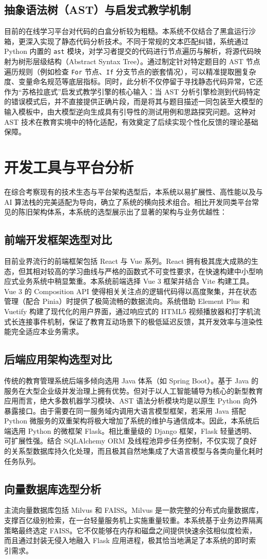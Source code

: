 \subsection{抽象语法树（AST）与启发式教学机制}
目前的在线学习平台对代码的白盒分析较为粗糙。本系统不仅结合了黑盒运行沙箱，更深入实现了静态代码分析技术。不同于常规的文本匹配纠错，系统通过 Python 内置的 \texttt{ast} 模块，对学习者提交的代码进行节点遍历与解析，将源代码映射为树形层级结构（Abstract Syntax Tree）。通过制定针对特定题目的 AST 节点遍历规则（例如检查 \texttt{For} 节点、\texttt{If} 分支节点的嵌套情况），可以精准提取圈复杂度、变量命名规范等底层指标。同时，此分析不仅停留于寻找静态代码异常，它还作为“苏格拉底式”启发式教学引擎的核心输入：当 AST 分析引擎检测到代码特定的错误模式后，并不直接提供正确片段，而是将其与题目描述一同包装至大模型的输入模板中，由大模型逆向生成具有引导性的测试用例和思路探究问题。这种对 AST 技术在教育实境中的特化适配，有效奠定了后续实现个性化反馈的理论基础保障。

\section{开发工具与平台分析}

在综合考察现有的技术生态与平台架构选型后，本系统以易扩展性、高性能以及与 AI 算法栈的完美适配为导向，确立了系统的横向技术组合。相比开发同类平台常见的陈旧架构体系，本系统的选型展示出了显著的架构与业务优越性：

\subsection{前端开发框架选型对比}
目前业界流行的前端框架包括 React 与 Vue 系列。React 拥有极其庞大成熟的生态，但其相对较高的学习曲线与严格的函数式不可变性要求，在快速构建中小型响应式业务系统中稍显繁重。本系统前端选择 Vue 3 框架并结合 Vite 构建工具。Vue 3 的 Composition API 使得相关关注点的逻辑代码得以高度聚集，并在状态管理（配合 Pinia）时提供了极简流畅的数据流向。系统借助 Element Plus 和 Vuetify 构建了现代化的用户界面，通过响应式的 HTML5 视频播放器和打字机流式长连接事件机制，保证了教育互动场景下的极低延迟反馈，其开发效率与渲染性能完全适应本业务需求。

\subsection{后端应用架构选型对比}
传统的教育管理系统后端多倾向选用 Java 体系（如 Spring Boot）。基于 Java 的服务在大型企业级并发治理上拥有优势。但对于以人工智能辅导为核心的新型教育应用而言，绝大多数机器学习模块、AST 语法分析模块均是以原生 Python 向外暴露接口。由于需要在同一服务域内调用大语言模型框架，若采用 Java 搭配 Python 微服务的双重架构将极大增加了系统的维护与通信成本。因此，本系统后端选用 Python 的微框架 Flask。相比重量级的 Django 框架，Flask 轻量透明、可扩展性强。结合 SQLAlchemy ORM 及线程池异步任务控制，不仅实现了良好的关系型数据库持久化处理，而且极其自然地集成了大语言模型与各类向量化耗时任务队列。

\subsection{向量数据库选型分析}
主流向量数据库包括 Milvus 和 FAISS。Milvus 是一款完整的分布式向量数据库，支撑百亿级别检索，在一台轻量服务机上实施重量较重。本系统基于业务边界隔离策略最终选定 FAISS。它不仅能够在内存和磁盘之间提供快速余弦相似度检索，而且通过封装无侵入地融入 Flask 应用进程，极其恰当地满足了本系统的即时索引需求。
